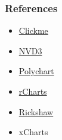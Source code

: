 \documentclass[10,portrait]{article}
\providecommand{\tightlist}{%
  \setlength{\itemsep}{0pt}\setlength{\parskip}{0pt}}
\begin{document}
\subsubsection{References}\label{references}

\begin{itemize}
\tightlist
\item
  \href{https://github.com/nachocab/clickme}{Clickme}\\
\item
  \href{http://nvd3.org/}{NVD3}\\
\item
  \href{https://github.com/Polychart/polychart2}{Polychart}\\
\item
  \href{http://ramnathv.github.io/rCharts/}{rCharts}\\
\item
  \href{http://rpubs.com/Koba/80208}{Rickshaw}\\
\item
  xCharts
\end{itemize}

\printbibliography
\end{document}
